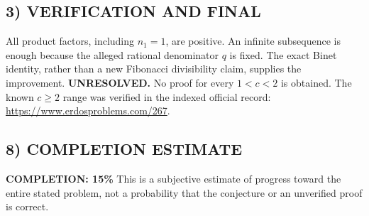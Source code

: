 \subsection*{3) VERIFICATION AND FINAL}
All product factors, including $n_1=1$, are positive. An infinite subsequence
is enough because the alleged rational denominator $q$ is fixed. The exact
Binet identity, rather than a new Fibonacci divisibility claim, supplies
the improvement. \textbf{UNRESOLVED.} No proof for every $1<c<2$ is obtained.
The known $c\ge2$ range was verified in the indexed official record:
\url{https://www.erdosproblems.com/267}.

\subsection*{8) COMPLETION ESTIMATE}
\textbf{COMPLETION: 15\%}
This is a subjective estimate of progress toward the entire stated problem, not a probability that the conjecture or an unverified proof is correct.
